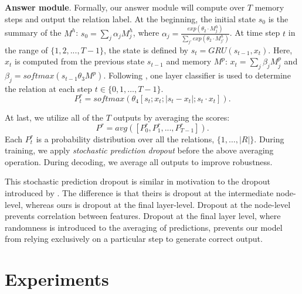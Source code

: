 \documentclass[11pt,a4paper]{article}
\begin{document}
\noindent\textbf{Answer module}.
Formally, our answer module will compute over $T$ memory steps and output the relation label. 
At the beginning, the initial state $s_0$ is the summary of the $M^h$: $s_0=\sum_j \alpha_j M^h_{j}$, where $\alpha_j = \frac{exp(\theta_2 \cdot M^h_j)}{\sum_{j'}exp(\theta_2 \cdot M^h_{j'})}$. At time step $t$ in the range of $\{1, 2, ..., T-1\}$, the state is defined by $s_t = GRU(s_{t-1}, x_t)$. 
Here, $x_t$ is computed from the previous state $s_{t-1}$ and memory $M^p$: $x_t=\sum_j\beta_j M^p_j$ and $\beta_j = softmax(s_{t-1}\theta_3 M^p)$. 
Following \cite{mou2015natural}, one layer classifier is used to determine the relation at each step $t \in \{0,1,\ldots,T-1\}$. 
\begin{equation}
P^r_t = softmax(\theta_4[s_t; x_t; |s_t - x_t|; s_t \cdot x_t]).
\label{eq:begin}
\end{equation}


At last, we utilize all of the $T$ outputs by averaging the scores:
\begin{equation}
P^r = avg([P_0^{r}, P_1^{r}, ..., P_{T-1}^{r}]).
\label{eq:avg}
\end{equation}\vspace{-0.1cm}
Each $P_t^{r}$ is a probability distribution over all the relations, $\{1,\ldots,|R|\}$. During training, we apply \emph{stochastic prediction dropout} before the above averaging operation. During decoding, we average all outputs to improve robustness. 

This stochastic prediction dropout is similar in motivation to the dropout introduced by \cite{srivastava2014dropout}. The difference is that theirs is dropout at the intermediate node-level, whereas ours is dropout at the final layer-level. Dropout at the node-level prevents correlation between features. Dropout at the final layer level, where randomness is introduced to the averaging of predictions, prevents our model from relying exclusively on a particular step to generate correct output. 
 \section{Experiments}
\label{sec:exp}
\end{document}
